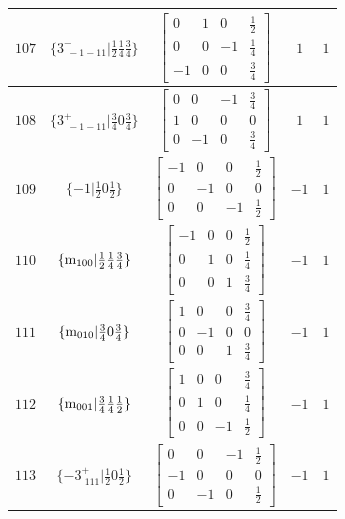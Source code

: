 \documentclass[fleqn,8pt]{jsarticle}
\begin{document}
\begin{longtable}{ccccc}
$ 107 $ & $ \{3^{-}_{\,\,-1-11}|\frac{1}{2} \frac{1}{4} \frac{3}{4}\} $ & $ \begin{bmatrix} 0 & 1 & 0 & \frac{1}{2} \\ 0 & 0 & -1 & \frac{1}{4} \\ -1 & 0 & 0 & \frac{3}{4} \end{bmatrix} $ & $ 1 $ & $ 1 $ \\ \hline
$ 108 $ & $ \{3^{+}_{\,\,-1-11}|\frac{3}{4} 0 \frac{3}{4}\} $ & $ \begin{bmatrix} 0 & 0 & -1 & \frac{3}{4} \\ 1 & 0 & 0 & 0 \\ 0 & -1 & 0 & \frac{3}{4} \end{bmatrix} $ & $ 1 $ & $ 1 $ \\ \hline
$ 109 $ & $ \{-1|\frac{1}{2} 0 \frac{1}{2}\} $ & $ \begin{bmatrix} -1 & 0 & 0 & \frac{1}{2} \\ 0 & -1 & 0 & 0 \\ 0 & 0 & -1 & \frac{1}{2} \end{bmatrix} $ & $ -1 $ & $ 1 $ \\ \hline
$ 110 $ & $ \{{\rm m}_{100}|\frac{1}{2} \frac{1}{4} \frac{3}{4}\} $ & $ \begin{bmatrix} -1 & 0 & 0 & \frac{1}{2} \\ 0 & 1 & 0 & \frac{1}{4} \\ 0 & 0 & 1 & \frac{3}{4} \end{bmatrix} $ & $ -1 $ & $ 1 $ \\ \hline
$ 111 $ & $ \{{\rm m}_{010}|\frac{3}{4} 0 \frac{3}{4}\} $ & $ \begin{bmatrix} 1 & 0 & 0 & \frac{3}{4} \\ 0 & -1 & 0 & 0 \\ 0 & 0 & 1 & \frac{3}{4} \end{bmatrix} $ & $ -1 $ & $ 1 $ \\ \hline
$ 112 $ & $ \{{\rm m}_{001}|\frac{3}{4} \frac{1}{4} \frac{1}{2}\} $ & $ \begin{bmatrix} 1 & 0 & 0 & \frac{3}{4} \\ 0 & 1 & 0 & \frac{1}{4} \\ 0 & 0 & -1 & \frac{1}{2} \end{bmatrix} $ & $ -1 $ & $ 1 $ \\ \hline
$ 113 $ & $ \{-3^{+}_{\,\,111}|\frac{1}{2} 0 \frac{1}{2}\} $ & $ \begin{bmatrix} 0 & 0 & -1 & \frac{1}{2} \\ -1 & 0 & 0 & 0 \\ 0 & -1 & 0 & \frac{1}{2} \end{bmatrix} $ & $ -1 $ & $ 1 $ \\ \hline

\end{longtable}
\end{document}
